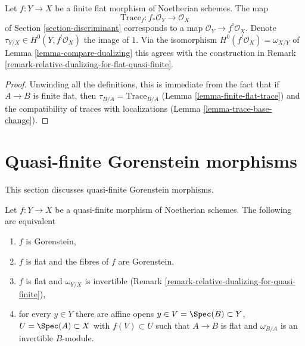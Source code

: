 \begin{lemma}
\label{lemma-compare-trace}
Let $f : Y \to X$ be a finite flat morphism of Noetherian schemes.
The map
$$
\text{Trace}_f : f_*\mathcal{O}_Y \longrightarrow \mathcal{O}_X
$$
of Section \ref{section-discriminant}
corresponds to a map $\mathcal{O}_Y \to f^!\mathcal{O}_X$.
Denote $\tau_{Y/X} \in H^0(Y, f^!\mathcal{O}_X)$ the image of $1$.
Via the isomorphism $H^0(f^!\mathcal{O}_X) = \omega_{X/Y}$ of
Lemma \ref{lemma-compare-dualizing}
this agrees with the construction in
Remark \ref{remark-relative-dualizing-for-flat-quasi-finite}.
\end{lemma}

\begin{proof}
Unwinding all the definitions, this is immediate from the fact
that if $A \to B$ is finite flat, then $\tau_{B/A} = \text{Trace}_{B/A}$
(Lemma \ref{lemma-finite-flat-trace}) and the compatibility
of traces with localizations (Lemma \ref{lemma-trace-base-change}).
\end{proof}








\section{Quasi-finite Gorenstein morphisms}
\label{section-gorenstein-lci}

\noindent
This section discusses quasi-finite Gorenstein morphisms.

\begin{lemma}
\label{lemma-gorenstein-quasi-finite}
Let $f : Y \to X$ be a quasi-finite morphism of Noetherian schemes.
The following are equivalent
\begin{enumerate}
\item $f$ is Gorenstein,
\item $f$ is flat and the fibres of $f$ are Gorenstein,
\item $f$ is flat and $\omega_{Y/X}$ is invertible
(Remark \ref{remark-relative-dualizing-for-quasi-finite}),
\item for every $y \in Y$ there are affine opens
$y \in V = \Spec(B) \subset Y$, $U = \Spec(A) \subset X$
with $f(V) \subset U$ such that $A \to B$ is flat
and $\omega_{B/A}$ is an invertible $B$-module.
\end{enumerate}
\end{lemma}

